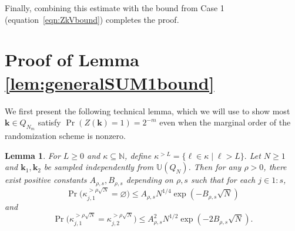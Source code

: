 \documentclass{article}
\newtheorem{lemma}{Lemma}
\theoremstyle{definition}
\renewcommand{\leq}{\leqslant}
\renewcommand{\geq}{\geqslant}
\renewcommand{\emptyset}{\varnothing}
\newcommand{\natu}{\mathbb{N}}
\newcommand{\bsk}{\boldsymbol{k}}
\newcommand{\dunif}{\mathbb{U}}
\begin{document}
Finally, combining this estimate with the bound from Case 1 (equation~\eqref{eqn:ZkVbound}) completes the proof.



\section{Proof of Lemma \ref{lem:generalSUM1bound}}

We first present the following technical lemma, which we will use to show most $\bsk\in Q_{N_m}$ satisfy $\Pr(Z(\bsk)=1)=2^{-m}$ even when the marginal order of the randomization scheme is nonzero.

\begin{lemma}\label{lem:maxkappa}
For $L\geq 0$ and $\kappa\subseteq\natu$, define $\kappa^{>L}=\{\ell\in \kappa\mid \ell>L \}.$
Let $N\geq 1$ and $\bsk_1,\bsk_2$ be sampled independently from $\dunif (Q_N)$. Then for any $\rho>0$, there exist positive constants $A_{\rho,s}, B_{\rho,s}$ depending on $\rho,s$ such that for each $j\in 1{:}s$,
$$\Pr\Big(\kappa^{>\rho\sqrt{N}}_{j,1}=\emptyset\Big)\leq A_{\rho,s}N^{1/4}\exp(- B_{\rho,s}\sqrt{N})$$
and 
$$\Pr\Big(\kappa^{>\rho\sqrt{N}}_{j,1}=\kappa^{>\rho\sqrt{N}}_{j,2}\Big)\leq A^2_{\rho,s}N^{1/2}\exp(- 2B_{\rho,s}\sqrt{N}).$$
\end{lemma}
\end{document}
